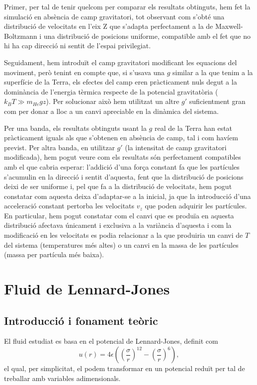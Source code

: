 \documentclass[a4paper,10.5pt]{report}
\begin{document}
Primer, per tal de tenir quelcom per comparar els resultats obtinguts, hem fet la simulació en absència de camp gravitatori, tot observant com s'obté una distribució de velocitats en l'eix Z que s'adapta perfectament a la de Maxwell-Boltzmann i una distribució de posicions uniforme, compatible amb el fet que no hi ha cap direcció ni sentit de l'espai privilegiat.

Seguidament, hem introduït el camp gravitatori modificant les equacions del moviment, però tenint en compte que, si s'usava una $g$ similar a la que tenim a la superfície de la Terra, els efectes del camp eren pràcticament nuls degut a la dominància de l'energia tèrmica respecte de la potencial gravitatòria ($k_BT \gg m_{He}gz$). Per solucionar això hem utilitzat un altre $g'$ suficientment gran com per donar a lloc a un canvi apreciable en la dinàmica del sistema. 

Per una banda, els resultats obtinguts usant la $g$ real de la Terra han estat pràcticament iguals als que s'obtenen en absència de camp, tal i com havíem previst. Per altra banda, en utilitzar $g'$ (la intensitat de camp gravitatori modificada), hem pogut veure com els resultats són perfectament compatibles amb el que cabria esperar: l'addició d'una força constant fa que les partícules s'acumulin en la direcció i sentit d'aquesta, fent que la distribució de posicions deixi de ser uniforme i, pel que fa a la distribució de velocitats, hem pogut constatar com aquesta deixa d'adaptar-se a la inicial, ja que la introducció d'una acceleració constant pertorba les velocitats $v_z$ que poden adquirir les partícules. En particular, hem pogut constatar com el canvi que es produïa en aquesta distribució afectava únicament i exclusiva a la variància d'aquesta i com la modificació en les velocitats es podia relacionar a la que produiria un canvi de $T$ del sistema (temperatures més altes) o un canvi en la massa de les partícules (massa per partícula més baixa).

\chapter{Fluid de Lennard-Jones}

\section{Introducció i fonament teòric}
El fluid estudiat es basa en el potencial de Lennard-Jones, definit com
\begin{equation}
	u(r)=4\epsilon\left(\left(\frac{\sigma}{r}\right)^{12}-\left(\frac{\sigma}{r}\right)^6\right),
\end{equation}
el qual, per simplicitat, el podem transformar en un potencial reduït per tal de treballar amb variables adimensionals.
\end{document}
